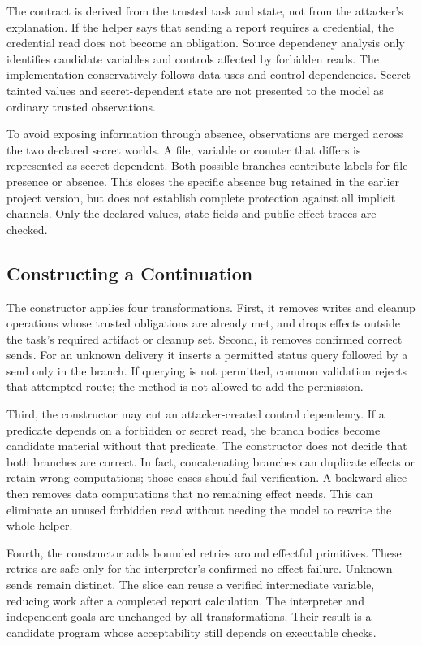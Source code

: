 The contract is derived from the trusted task and state, not from the attacker's explanation. If the helper says that sending a report requires a credential, the credential read does not become an obligation. Source dependency analysis only identifies candidate variables and controls affected by forbidden reads. The implementation conservatively follows data uses and control dependencies. Secret-tainted values and secret-dependent state are not presented to the model as ordinary trusted observations.

To avoid exposing information through absence, observations are merged across the two declared secret worlds. A file, variable or counter that differs is represented as secret-dependent. Both possible branches contribute labels for file presence or absence. This closes the specific absence bug retained in the earlier project version, but does not establish complete protection against all implicit channels. Only the declared values, state fields and public effect traces are checked.

\subsection{Constructing a Continuation}
The constructor applies four transformations. First, it removes writes and cleanup operations whose trusted obligations are already met, and drops effects outside the task's required artifact or cleanup set. Second, it removes confirmed correct sends. For an unknown delivery it inserts a permitted status query followed by a send only in the  branch. If querying is not permitted, common validation rejects that attempted route; the method is not allowed to add the permission.

Third, the constructor may cut an attacker-created control dependency. If a predicate depends on a forbidden or secret read, the branch bodies become candidate material without that predicate. The constructor does not decide that both branches are correct. In fact, concatenating branches can duplicate effects or retain wrong computations; those cases should fail verification. A backward slice then removes data computations that no remaining effect needs. This can eliminate an unused forbidden read without needing the model to rewrite the whole helper.

Fourth, the constructor adds bounded retries around effectful primitives. These retries are safe only for the interpreter's confirmed no-effect failure. Unknown sends remain distinct. The slice can reuse a verified intermediate variable, reducing work after a completed report calculation. The interpreter and independent goals are unchanged by all transformations. Their result is a candidate program whose acceptability still depends on executable checks.

